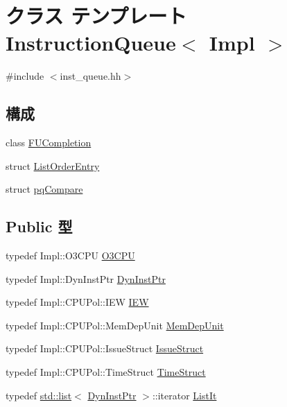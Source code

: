 \hypertarget{classInstructionQueue}{
\section{クラス テンプレート InstructionQueue$<$ Impl $>$}
\label{classInstructionQueue}
}


{\ttfamily \#include $<$inst\_\-queue.hh$>$}\subsection*{構成}
\begin{DoxyCompactItemize}
\item 
class \hyperlink{classInstructionQueue_1_1FUCompletion}{FUCompletion}
\item 
struct \hyperlink{structInstructionQueue_1_1ListOrderEntry}{ListOrderEntry}
\item 
struct \hyperlink{structInstructionQueue_1_1pqCompare}{pqCompare}
\end{DoxyCompactItemize}
\subsection*{Public 型}
\begin{DoxyCompactItemize}
\item 
typedef Impl::O3CPU \hyperlink{classInstructionQueue_a44622cf06940413482836cb62931ac3f}{O3CPU}
\item 
typedef Impl::DynInstPtr \hyperlink{classInstructionQueue_a028ce10889c5f6450239d9e9a7347976}{DynInstPtr}
\item 
typedef Impl::CPUPol::IEW \hyperlink{classInstructionQueue_a23f60a4095b5240dfcb18a4ec40210a9}{IEW}
\item 
typedef Impl::CPUPol::MemDepUnit \hyperlink{classInstructionQueue_a2e16eb5b46c2a1d3fed4c6bd5f99e368}{MemDepUnit}
\item 
typedef Impl::CPUPol::IssueStruct \hyperlink{classInstructionQueue_aa56c7524890b3a6337668c507be0f272}{IssueStruct}
\item 
typedef Impl::CPUPol::TimeStruct \hyperlink{classInstructionQueue_ab6d04a6276f6c61ee6a3a74902e7681b}{TimeStruct}
\item 
typedef \hyperlink{classstd_1_1list}{std::list}$<$ \hyperlink{classInstructionQueue_a028ce10889c5f6450239d9e9a7347976}{DynInstPtr} $>$::iterator \hyperlink{classInstructionQueue_a184cb829e22cc656acb41864f68f51ea}{ListIt}
\end{DoxyCompactItemize}
